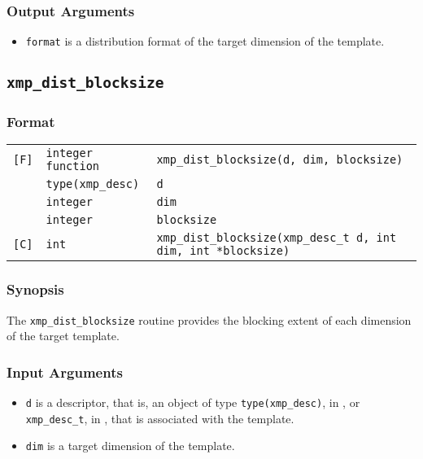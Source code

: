 \subsubsection*{Output Arguments}
\begin{itemize}
 \item {\tt format} is a distribution format of the target dimension of the template.
\end{itemize}


\subsection{\tt xmp\_dist\_blocksize}

\subsubsection*{Format}

\begin{tabular}{lll}

\verb![F]!& {\tt integer function}& {\tt xmp\_dist\_blocksize(d, dim, blocksize)}\\
          & {\tt type(xmp\_desc)} & {\tt d}\\
          & {\tt integer} & {\tt dim}\\
          & {\tt integer} & {\tt blocksize}\\

\verb![C]!&  {\tt int}& {\tt xmp\_dist\_blocksize(xmp\_desc\_t d, int dim, int *blocksize)}\\

\end{tabular}

\subsubsection*{Synopsis}

The {\tt xmp\_dist\_blocksize} routine provides the blocking extent of each dimension of the target template.


\subsubsection*{Input Arguments}
\begin{itemize}
 \item {\tt d} is a descriptor, that is, an object of type 
       {\tt type(xmp\_desc)}, in {\XMPF}, or {\tt xmp\_desc\_t},
       in {\XMPC}, that is associated with the template.
        \item {\tt dim} is a target dimension of the template.
\end{itemize}

